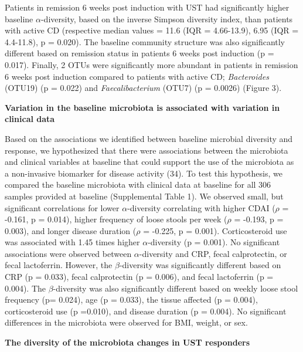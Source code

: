 \documentclass[12pt,]{article}
\begin{document}
Patients in remission 6 weeks post induction with UST had significantly
higher baseline \({\alpha}\)-diversity, based on the inverse Simpson
diversity index, than patients with active CD (respective median values
= 11.6 (IQR = 4.66-13.9), 6.95 (IQR = 4.4-11.8), p = 0.020). The
baseline community structure was also significantly different based on
remission status in patients 6 weeks post induction (p = 0.017).
Finally, 2 OTUs were significantly more abundant in patients in
remission 6 weeks post induction compared to patients with active CD;
\emph{Bacteroides} (OTU19) (p = 0.022) and \emph{Faecalibacterium}
(OTU7) (p = 0.0026) (Figure 3).

\textbf{Variation in the baseline microbiota is associated with
variation in clinical data}

Based on the associations we identified between baseline microbial
diversity and response, we hypothesized that there were associations
between the microbiota and clinical variables at baseline that could
support the use of the microbiota as a non-invasive biomarker for
disease activity (34). To test this hypothesis, we compared the baseline
microbiota with clinical data at baseline for all 306 samples provided
at baseline (Supplemental Table 1). We observed small, but significant
correlations for lower \({\alpha}\)-diversity correlating with higher
CDAI (\({\rho}\) = -0.161, p = 0.014), higher frequency of loose stools
per week (\({\rho}\) = -0.193, p = 0.003), and longer disease duration
(\({\rho}\) = -0.225, p = 0.001). Corticosteroid use was associated with
1.45 times higher \({\alpha}\)-diversity (p = 0.001). No significant
associations were observed between \({\alpha}\)-diversity and CRP, fecal
calprotectin, or fecal lactoferrin. However, the \({\beta}\)-diversity
was significantly different based on CRP (p = 0.033), fecal calprotectin
(p = 0.006), and fecal lactoferrin (p = 0.004). The
\({\beta}\)-diversity was also significantly different based on weekly
loose stool frequency (p= 0.024), age (p = 0.033), the tissue affected
(p = 0.004), corticosteroid use (p =0.010), and disease duration (p =
0.004). No significant differences in the microbiota were observed for
BMI, weight, or sex.

\textbf{The diversity of the microbiota changes in UST responders}
\end{document}
